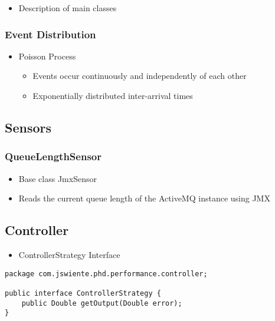 \begin{itemize}
	\item Description of main classes
\end{itemize}

\subsubsection{Event Distribution}

\begin{itemize}
	\item Poisson Process
	\begin{itemize}
		\item Events occur continuously and independently of each other
		\item Exponentially distributed inter-arrival times
	\end{itemize}
\end{itemize}

\subsection{Sensors}

\subsubsection{QueueLengthSensor}

\begin{itemize}
	\item Base class JmxSensor
	\item Reads the current queue length of the ActiveMQ instance using JMX
\end{itemize}

\subsection{Controller}

\begin{itemize}
	\item ControllerStrategy Interface
\end{itemize}

\begin{lstlisting}[caption={ControllerStrategy Interface},label=listing:ch5_controller_strategy]
package com.jswiente.phd.performance.controller;

public interface ControllerStrategy {
	public Double getOutput(Double error);
}
\end{lstlisting}

